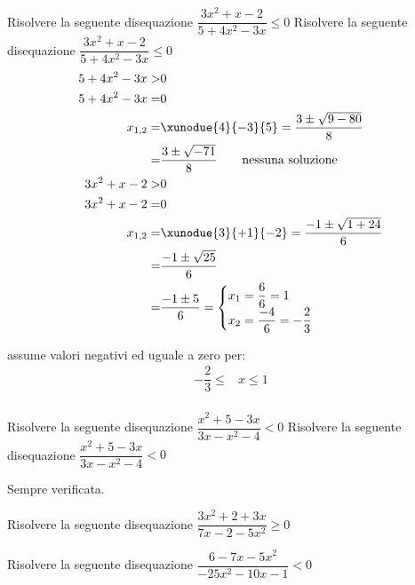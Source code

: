 \begin{exercise}
		Risolvere la seguente disequazione $\dfrac{3x^2+x-2}{5+4x^2-3x}\leq 0$
	\tcblower
	Risolvere la seguente disequazione $\dfrac{3x^2+x-2}{5+4x^2-3x}\leq 0$
	\begin{align*}
	5+4x^2-3x>&0\\
5+4x^2-3x=&0\\
x_{1,2}=&\xunodue{4}{-3}{5}=\dfrac{3\pm\sqrt{9-80}}{8}\\
=&\dfrac{3\pm\sqrt{-71}}{8}
\qquad\text{nessuna soluzione}\\
3x^2+x-2>&0\\
3x^2+x-2=&0\\
x_{1,2}=&\xunodue{3}{+1}{-2}=\dfrac{-1\pm\sqrt{1+24}}{6}\\
=&\dfrac{-1\pm\sqrt{25}}{6}\\
=&\dfrac{-1\pm 5}{6}=\begin{cases}
x_1=\dfrac{6}{6}=1\\
x_2=\dfrac{-4}{6}=-\dfrac{2}{3}
\end{cases}\\
	\end{align*}
	\begin{center}
		
	\end{center}
assume valori negativi ed uguale a zero per:
\begin{align*}
-\dfrac{2}{3}\leq&x\leq 1\\
\end{align*}
\end{exercise}
\begin{exercise}
		Risolvere la seguente disequazione $\dfrac{x^2+5-3x}{3x-x^2-4}<0$
	\tcblower
	Risolvere la seguente disequazione $\dfrac{x^2+5-3x}{3x-x^2-4}< 0$
	
	Sempre verificata.
\end{exercise}
\begin{exercise}[no solution]
		Risolvere la seguente disequazione $\dfrac{3x^2+2+3x}{7x-2-5x^2}\geq0$
\end{exercise}
\begin{exercise}[no solution]
		Risolvere la seguente disequazione $\dfrac{6-7x-5x^2}{-25x^2-10x-1}< 0$
\end{exercise}